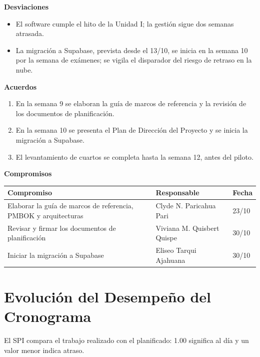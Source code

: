 \documentclass[11pt,a4paper]{article}
\begin{document}
\vspace{0.1cm}
\noindent\textbf{Desviaciones}
\begin{itemize}[leftmargin=*, itemsep=0pt]
    \item El software cumple el hito de la Unidad I; la gestión sigue dos semanas atrasada.
    \item La migración a Supabase, prevista desde el 13/10, se inicia en la semana 10 por la semana de exámenes; se vigila el disparador del riesgo de retraso en la nube.
\end{itemize}
\noindent\textbf{Acuerdos}
\begin{enumerate}[leftmargin=*, itemsep=0pt]
    \item En la semana 9 se elaboran la guía de marcos de referencia y la revisión de los documentos de planificación.
    \item En la semana 10 se presenta el Plan de Dirección del Proyecto y se inicia la migración a Supabase.
    \item El levantamiento de cuartos se completa hasta la semana 12, antes del piloto.
\end{enumerate}
\noindent\textbf{Compromisos}

\vspace{0.05cm}
{\footnotesize
{}
\noindent\begin{tabularx}{\textwidth}{@{}L P{3.6cm} C{1.6cm}@{}}
\toprule
{}
\textbf{Compromiso} & \textbf{Responsable} & \textbf{Fecha} \\
\midrule
Elaborar la guía de marcos de referencia, PMBOK y arquitecturas & Clyde N. Paricahua Pari & 23/10 \\
Revisar y firmar los documentos de planificación & Viviana M. Quisbert Quispe & 30/10 \\
Iniciar la migración a Supabase & Eliseo Tarqui Ajahuana & 30/10 \\
\bottomrule
\end{tabularx}
}

\section{Evolución del Desempeño del Cronograma}
El SPI compara el trabajo realizado con el planificado: 1.00 significa al día y un valor menor indica atraso.
\end{document}
